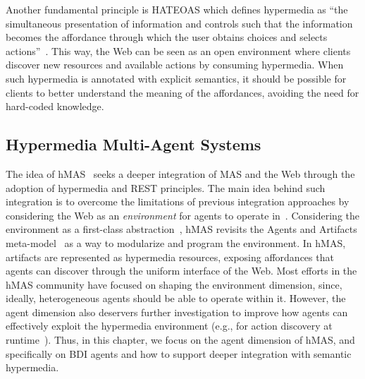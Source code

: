 Another fundamental principle is \ac{HATEOAS} which defines hypermedia as ``the simultaneous presentation of information and controls such that the information becomes the affordance through which the user obtains choices and selects actions''~\cite{DBLP:journals/toit/FieldingT02}.
This way, the Web can be seen as an open environment
where clients discover new resources and available actions by consuming hypermedia.
%
When such hypermedia is annotated with explicit semantics,
it should be possible for clients to better understand the meaning of the affordances,
avoiding the need for hard-coded knowledge.
%


\subsection{Hypermedia Multi-Agent Systems}

The idea of \ac{hMAS}~\cite{DBLP:conf/atal/CiorteaMGBRZ19} seeks a deeper integration of \ac{MAS} and the Web through the adoption of hypermedia and \ac{REST} principles.
%
The main idea behind such integration is to overcome the limitations of previous integration approaches by considering the Web as an \emph{environment} for agents to operate in~\cite{DBLP:conf/emas/CiorteaBR18}.
%
Considering the environment as a first-class abstraction~\cite{weyns2007aamas},
\ac{hMAS} revisits the Agents and Artifacts meta-model~\cite{ricci2011aamas} as a way to modularize and program the environment.
%
In \ac{hMAS}, artifacts are represented as hypermedia resources, exposing affordances that agents can discover through the uniform interface of the Web.
%
Most efforts in the \ac{hMAS} community have focused on shaping the environment dimension, 
since, ideally, 
heterogeneous agents should be able to operate within it.
%
However, the agent dimension also deservers further investigation to improve how agents can effectively exploit the hypermedia environment (e.g., for action discovery at runtime~\cite{vachtsevanou2024atal}).
%
Thus, 
in this chapter, 
we focus on the agent dimension of \ac{hMAS}, and
specifically on \ac{BDI} agents and how to support deeper integration with semantic hypermedia.

